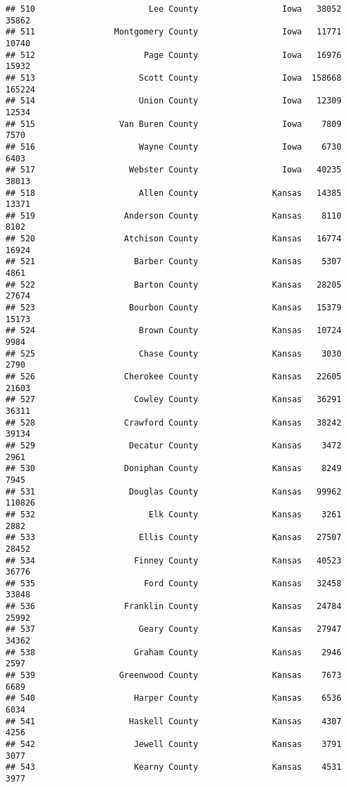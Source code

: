 \documentclass[
]{article}
\begin{document}
\begin{verbatim}
## 510                       Lee County                 Iowa   38052   35862
## 511                Montgomery County                 Iowa   11771   10740
## 512                      Page County                 Iowa   16976   15932
## 513                     Scott County                 Iowa  158668  165224
## 514                     Union County                 Iowa   12309   12534
## 515                 Van Buren County                 Iowa    7809    7570
## 516                     Wayne County                 Iowa    6730    6403
## 517                   Webster County                 Iowa   40235   38013
## 518                     Allen County               Kansas   14385   13371
## 519                  Anderson County               Kansas    8110    8102
## 520                  Atchison County               Kansas   16774   16924
## 521                    Barber County               Kansas    5307    4861
## 522                    Barton County               Kansas   28205   27674
## 523                   Bourbon County               Kansas   15379   15173
## 524                     Brown County               Kansas   10724    9984
## 525                     Chase County               Kansas    3030    2790
## 526                  Cherokee County               Kansas   22605   21603
## 527                    Cowley County               Kansas   36291   36311
## 528                  Crawford County               Kansas   38242   39134
## 529                   Decatur County               Kansas    3472    2961
## 530                  Doniphan County               Kansas    8249    7945
## 531                   Douglas County               Kansas   99962  110826
## 532                       Elk County               Kansas    3261    2882
## 533                     Ellis County               Kansas   27507   28452
## 534                    Finney County               Kansas   40523   36776
## 535                      Ford County               Kansas   32458   33848
## 536                  Franklin County               Kansas   24784   25992
## 537                     Geary County               Kansas   27947   34362
## 538                    Graham County               Kansas    2946    2597
## 539                 Greenwood County               Kansas    7673    6689
## 540                    Harper County               Kansas    6536    6034
## 541                   Haskell County               Kansas    4307    4256
## 542                    Jewell County               Kansas    3791    3077
## 543                    Kearny County               Kansas    4531    3977

\end{verbatim}
\end{document}
